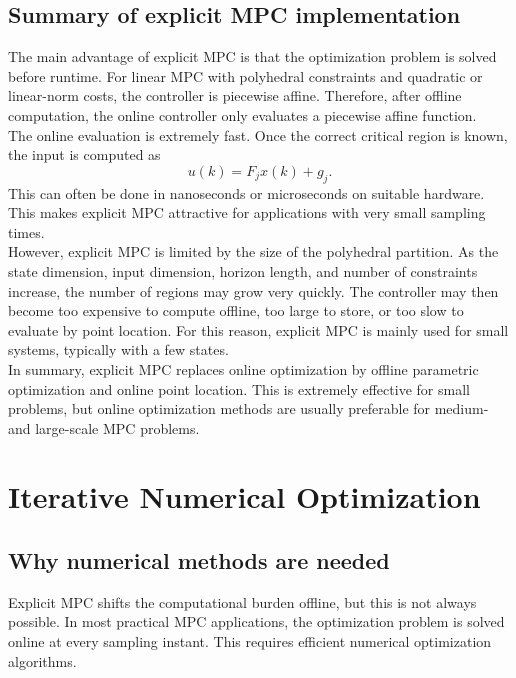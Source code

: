 \subsection{Summary of explicit MPC implementation}

The main advantage of explicit MPC is that the optimization problem is solved before runtime.
For linear MPC with polyhedral constraints and quadratic or linear-norm costs, the controller is
piecewise affine. Therefore, after offline computation, the online controller only evaluates a
piecewise affine function.\\
The online evaluation is extremely fast. Once the correct critical region is known, the input is
computed as
\[
    u(k)=F_jx(k)+g_j.
\]
This can often be done in nanoseconds or microseconds on suitable hardware. This makes
explicit MPC attractive for applications with very small sampling times.\\
However, explicit MPC is limited by the size of the polyhedral partition. As the state dimension,
input dimension, horizon length, and number of constraints increase, the number of regions may
grow very quickly. The controller may then become too expensive to compute offline, too large
to store, or too slow to evaluate by point location. For this reason, explicit MPC is mainly used
for small systems, typically with a few states.\\

In summary, explicit MPC replaces online optimization by offline parametric optimization and
online point location. This is extremely effective for small problems, but online optimization
methods are usually preferable for medium- and large-scale MPC problems.

\section{Iterative Numerical Optimization}

\subsection{Why numerical methods are needed}

Explicit MPC shifts the computational burden offline, but this is not always possible. In most
practical MPC applications, the optimization problem is solved online at every sampling instant.
This requires efficient numerical optimization algorithms.\\

